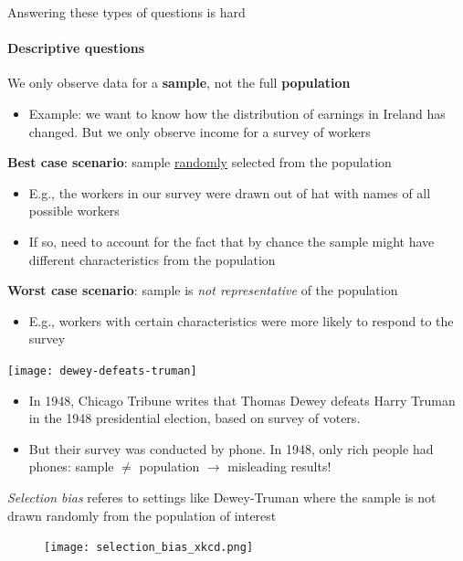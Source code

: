 \documentclass[11pt,english]{beamer}
\begin{document}
\begin{frame}{Answering these types of questions is hard}
\framesubtitle{Descriptive questions}
\pause 
We only observe data for a \textbf{sample}, not the full \textbf{population}
	\begin{itemize}
		\item 
		Example: we want to know how the distribution of earnings in Ireland has changed. But we only observe income for a survey of workers
	\end{itemize}
\vspace{0.25cm}

\pause
\textbf{Best case scenario}: sample \underline{randomly} selected from the population \\
	\begin{itemize}
		\item 
		E.g., the workers in our survey were drawn out of hat with names of all possible workers
		
		\item
		If so, need to account for the fact that by chance the sample might have different characteristics from the population
	\end{itemize}
	\vspace{0.25cm}

\pause
\textbf{Worst case scenario}: sample is \textit{not representative} of the population
	\begin{itemize}
		\item 
		E.g., workers with certain characteristics were more likely to respond to the survey
	\end{itemize}

\end{frame}


\begin{frame}
\centering
\texttt{[image: dewey-defeats-truman]}
\begin{itemize}
	\item 
	In 1948, Chicago Tribune writes that Thomas Dewey defeats Harry Truman in the 1948 presidential election, based on survey of voters.
	
	\pause
	\item
	But their survey was conducted by phone. In 1948, only rich people had phones: sample $\neq$ population $\rightarrow$ misleading results!
\end{itemize}

\end{frame}

\begin{frame}
	\textit{Selection bias} referes to settings like Dewey-Truman where the sample is not drawn randomly from the population of interest


	\begin{figure}
		\centering
		\texttt{[image: selection\_bias\_xkcd.png]}
	\end{figure}


\end{frame}
\end{document}
